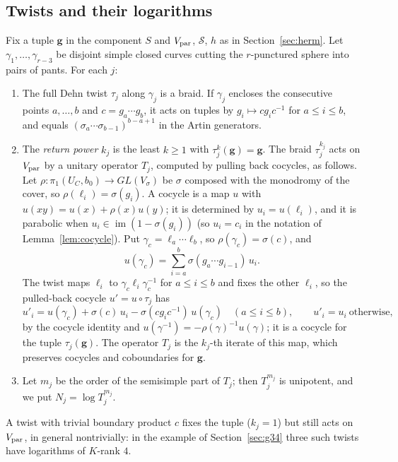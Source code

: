 \documentclass[11pt]{amsart}
\theoremstyle{definition}
\theoremstyle{remark}
\newcommand{\Vp}{V_{\rm par}}
\begin{document}
\subsection{Twists and their logarithms}\label{subsec:twists}
Fix a tuple $\mathbf g$ in the component $S$ and $\Vp$, $\mathcal S$, $h$ as in Section~\ref{sec:herm}. Let $\gamma_1,\dots,\gamma_{r-3}$ be disjoint simple closed curves cutting the $r$-punctured sphere into pairs of pants. For each $j$:
\begin{enumerate}
\item[(i)] The full Dehn twist $\tau_j$ along $\gamma_j$ is a braid. If $\gamma_j$ encloses the consecutive points $a,\dots,b$ and $c=g_a\cdots g_b$, it acts on tuples by $g_i\mapsto cg_ic^{-1}$ for $a\le i\le b$, and equals $(\sigma_a\cdots\sigma_{b-1})^{b-a+1}$ in the Artin generators.
\item[(ii)] The \emph{return power} $k_j$ is the least $k\ge1$ with $\tau_j^k(\mathbf g)=\mathbf g$. The braid $\tau_j^{k_j}$ acts on $V_{\rm par}$ by a unitary operator $T_j$, computed by pulling back cocycles, as follows. Let $\rho\colon\pi_1(U_C,b_0)\to GL(V_\sigma)$ be $\sigma$ composed with the monodromy of the cover, so $\rho(\ell_i)=\sigma(g_i)$. A cocycle is a map $u$ with $u(xy)=u(x)+\rho(x)u(y)$; it is determined by $u_i=u(\ell_i)$, and it is parabolic when $u_i\in\operatorname{im}(1-\sigma(g_i))$ (so $u_i=c_i$ in the notation of Lemma~\ref{lem:cocycle}). Put $\gamma_c=\ell_a\cdots\ell_b$, so $\rho(\gamma_c)=\sigma(c)$, and
\[
u(\gamma_c)=\textstyle\sum_{i=a}^b\sigma(g_a\cdots g_{i-1})\,u_i .
\]
The twist maps $\ell_i$ to $\gamma_c\ell_i\gamma_c^{-1}$ for $a\le i\le b$ and fixes the other $\ell_i$, so the pulled-back cocycle $u'=u\circ\tau_j$ has
\[
u'_i=u(\gamma_c)+\sigma(c)\,u_i-\sigma(cg_ic^{-1})\,u(\gamma_c)\quad(a\le i\le b),\qquad u'_i=u_i\ \text{otherwise},
\]
by the cocycle identity and $u(\gamma^{-1})=-\rho(\gamma)^{-1}u(\gamma)$; it is a cocycle for the tuple $\tau_j(\mathbf g)$. The operator $T_j$ is the $k_j$-th iterate of this map, which preserves cocycles and coboundaries for $\mathbf g$.
\item[(iii)] Let $m_j$ be the order of the semisimple part of $T_j$; then $T_j^{m_j}$ is unipotent, and we put $N_j=\log T_j^{m_j}$.
\end{enumerate}
A twist with trivial boundary product $c$ fixes the tuple ($k_j=1$) but still acts on $\Vp$, in general nontrivially: in the example of Section~\ref{sec:g34} three such twists have logarithms of $K$-rank $4$.
\end{document}
